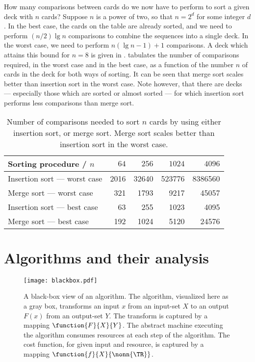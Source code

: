 \documentclass[b5paper, english, oneside]{memoir}
\begin{document}
How many comparisons between cards do we now have to perform to sort a given deck with $n$ cards? Suppose $n$ is a power of two, so that $n = 2^d$ for some integer $d$. In the best case, the cards on the table are already sorted, and we need to perform $(n / 2) \lg{n}$ comparisons to combine the sequences into a single deck. In the worst case, we need to perform $n (\lg{n} - 1) + 1$ comparisons. A deck which attains this bound for $n = 8$ is given in .  tabulates the number of comparisons required, in the worst case and in the best case, as a function of the number $n$ of cards in the deck for both ways of sorting. It can be seen that merge sort scales better than insertion sort in the worst case. Note however, that there are decks --- especially those which are sorted or almost sorted --- for which insertion sort performs less comparisons than merge sort.

\begin{table}
\begin{tabular}{|l|r|r|r|r|}
\hline 
Sorting procedure / $n$ & $64$ & $256$ & $1024$ & $4096$\\
\hline 
Insertion sort --- worst case & 2016 & 32640 & 523776 & 8386560 \\
Merge sort --- worst case & 321 & 1793 & 9217 & 45057 \\
Insertion sort --- best case & 63 & 255 & 1023 & 4095 \\
Merge sort --- best case & 192 & 1024 & 5120 & 24576 \\
\hline 
\end{tabular}
\centering
\caption{Number of comparisons needed to sort $n$ cards by using either insertion sort, or merge sort. Merge sort scales better than insertion sort in the worst case.}
\label{PlayingCardComparisons}
\end{table}

\section{Algorithms and their analysis}

\begin{figure}
\centering
\texttt{[image: blackbox.pdf]}
\caption{A black-box view of an algorithm. The algorithm, visualized here as a gray box, transforms an input $x$ from an input-set $X$ to an output $F(x)$ from an output-set $Y$. The transform is captured by a mapping $\function{F}{X}{Y}$. The abstract machine executing the algorithm consumes resources at each step of the algorithm. The cost function, for given input and resource, is captured by a mapping $\function{f}{X}{\nonn{\TR}}$.}
\label{AlgorithmBlackbox}
\end{figure}
\end{document}
